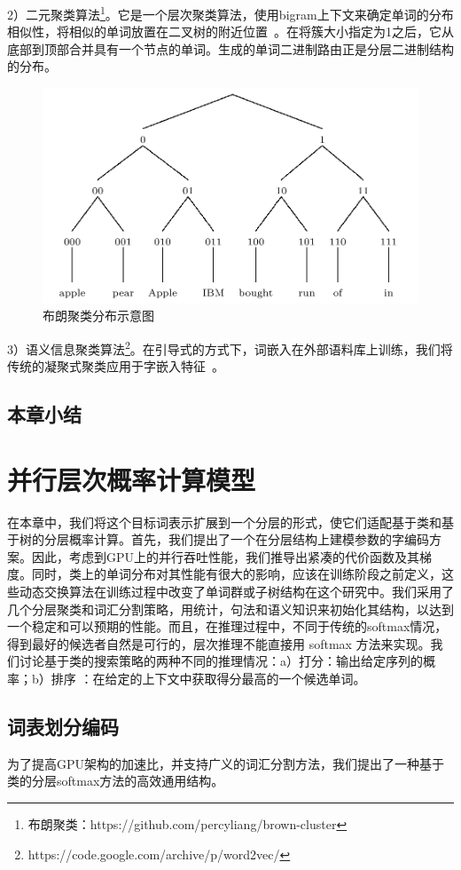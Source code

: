 2）二元聚类算法\footnote{布朗聚类：https://github.com/percyliang/brown-cluster}。它是一个层次聚类算法，使用bigram上下文来确定单词的分布相似性，将相似的单词放置在二叉树的附近位置~。在将簇大小指定为1之后，它从底部到顶部合并具有一个节点的单词。生成的单词二进制路由正是分层二进制结构的分布。
\begin{figure}[!ht]
  \centering
\includegraphics[width=0.6\linewidth]{./figures/brown.png}
\caption{布朗聚类分布示意图}\label{fig:brown}
\end{figure}

3）语义信息聚类算法\footnote{https://code.google.com/archive/p/word2vec/}。在引导式的方式下，词嵌入在外部语料库上训练，我们将传统的凝聚式聚类应用于字嵌入特征~。


\section{本章小结}

\chapter{并行层次概率计算模型}
在本章中，我们将这个目标词表示扩展到一个分层的形式，使它们适配基于类和基于树的分层概率计算。首先，我们提出了一个在分层结构上建模参数的字编码方案。因此，考虑到GPU上的并行吞吐性能，我们推导出紧凑的代价函数及其梯度。同时，类上的单词分布对其性能有很大的影响，应该在训练阶段之前定义，这些动态交换算法在训练过程中改变了单词群或子树结构在这个研究中。我们采用了几个分层聚类和词汇分割策略，用统计，句法和语义知识来初始化其结构，以达到一个稳定和可以预期的性能。而且，在推理过程中，不同于传统的softmax情况，得到最好的候选者自然是可行的，层次推理不能直接用 softmax 方法来实现。我们讨论基于类的搜索策略的两种不同的推理情况：a）打分：输出给定序列的概率；b）排序   ：在给定的上下文中获取得分最高的一个候选单词。
\section{词表划分编码}
为了提高GPU架构的加速比，并支持广义的词汇分割方法，我们提出了一种基于类的分层softmax方法的高效通用结构。


